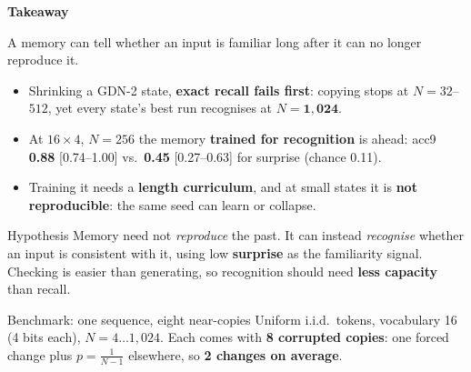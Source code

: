 \documentclass{article}
\begin{document}
\vspace{0.75in}
\begin{minipage}[t]{13.7in}\vspace{0pt}
\begin{keybox}
  {\fontsize{44}{52}\selectfont\bfseries Takeaway\par}\vspace{0.2in}
  A memory can tell whether an input is familiar long after it can no longer reproduce it.
  \begin{itemize}[label=\textcolor{white}{\textbullet}]
    \item Shrinking a GDN-2 state, \textbf{exact recall fails first}: copying stops at $N{=}32$--$512$,
          yet every state's best run recognises at $N{=}\mathbf{1{,}024}$.
    \item At $16{\times}4$, $N{=}256$ the memory \textbf{trained for recognition} is ahead:
          acc9 \textbf{0.88} [0.74--1.00] vs.\ \textbf{0.45} [0.27--0.63] for surprise (chance 0.11).
    \item Training it needs a \textbf{length curriculum}, and at small states it is \textbf{not reproducible}: the same seed can learn or collapse.
  \end{itemize}
\end{keybox}
\begin{block}{Hypothesis}
  Memory need not \emph{reproduce} the past. It can instead \emph{recognise} whether an input is consistent with it,
  using low \textbf{surprise} as the familiarity signal.
  Checking is easier than generating, so recognition should need \textbf{less capacity} than recall.
\end{block}
\begin{block}{Benchmark: one sequence, eight near-copies}
  Uniform i.i.d.\ tokens, vocabulary 16 (4 bits each), $N=4\ldots1{,}024$.
  Each comes with \textbf{8 corrupted copies}: one forced change plus $p=\tfrac1{N-1}$ elsewhere, so \textbf{2 changes on average}.


\end{block}
\end{minipage}
\end{document}
